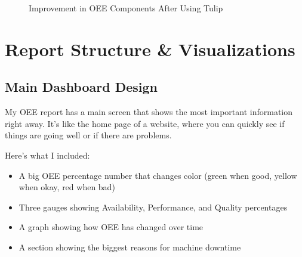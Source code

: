 \documentclass{article}
\begin{document}
\begin{figure}[H]
\centering
{}
\caption{Improvement in OEE Components After Using Tulip}
\end{figure}

\section{Report Structure \& Visualizations}

\subsection{Main Dashboard Design}
My OEE report has a main screen that shows the most important information right away. It's like the home page of a website, where you can quickly see if things are going well or if there are problems.

Here's what I included:
\begin{itemize}
    \item A big OEE percentage number that changes color (green when good, yellow when okay, red when bad)
    \item Three gauges showing Availability, Performance, and Quality percentages
    \item A graph showing how OEE has changed over time
    \item A section showing the biggest reasons for machine downtime
\end{itemize}
\end{document}

